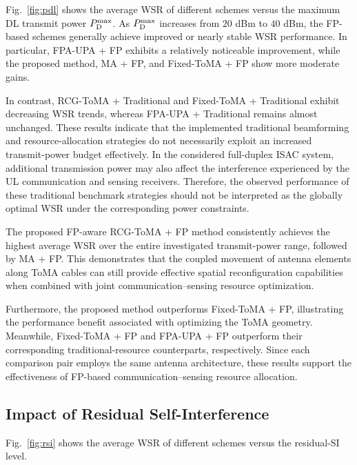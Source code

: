 \documentclass[letterpaper,journal]{IEEEtran}
\begin{document}
Fig.~\ref{fig:pdl} shows the average WSR of different schemes versus the
maximum DL transmit power $P_{\rm D}^{\max}$. As
$P_{\rm D}^{\max}$ increases from $20$ dBm to $40$ dBm, the FP-based
schemes generally achieve improved or nearly stable WSR performance. In
particular, FPA-UPA + FP exhibits a relatively noticeable improvement,
while the proposed method, MA + FP, and Fixed-ToMA + FP show more
moderate gains.

In contrast, RCG-ToMA + Traditional and Fixed-ToMA + Traditional exhibit
decreasing WSR trends, whereas FPA-UPA + Traditional remains almost
unchanged. These results indicate that the implemented traditional
beamforming and resource-allocation strategies do not necessarily
exploit an increased transmit-power budget effectively. In the
considered full-duplex ISAC system, additional transmission power may
also affect the interference experienced by the UL communication and
sensing receivers. Therefore, the observed performance of these
traditional benchmark strategies should not be interpreted as the
globally optimal WSR under the corresponding power constraints.

The proposed FP-aware RCG-ToMA + FP method consistently achieves the
highest average WSR over the entire investigated transmit-power range,
followed by MA + FP. This demonstrates that the coupled movement of
antenna elements along ToMA cables can still provide effective spatial
reconfiguration capabilities when combined with joint
communication--sensing resource optimization.

Furthermore, the proposed method outperforms Fixed-ToMA + FP,
illustrating the performance benefit associated with optimizing the ToMA
geometry. Meanwhile, Fixed-ToMA + FP and FPA-UPA + FP outperform their
corresponding traditional-resource counterparts, respectively. Since
each comparison pair employs the same antenna architecture, these
results support the effectiveness of FP-based communication--sensing
resource allocation.

\subsection{Impact of Residual Self-Interference}
\label{subsec:rsi}

Fig.~\ref{fig:rsi} shows the average WSR of different schemes versus the
residual-SI level.
\end{document}
